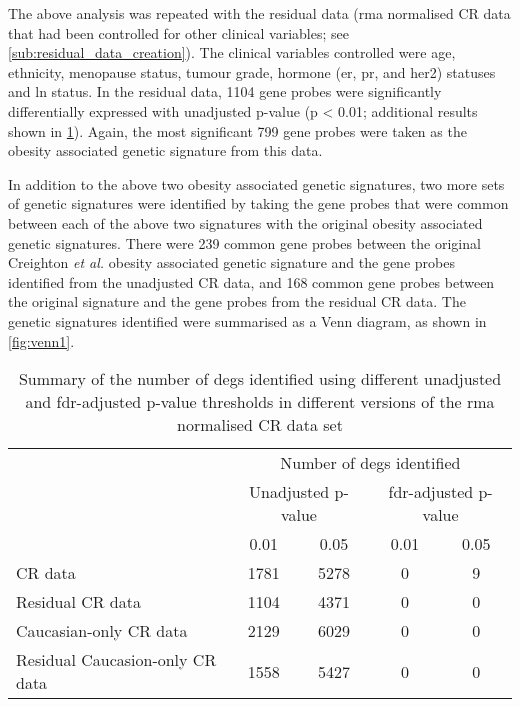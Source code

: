 The above analysis was repeated with the residual data (\gls{rma} normalised CR data that had been controlled for other clinical variables; see \cref{sub:residual_data_creation}).
The clinical variables controlled were age, ethnicity, menopause status, tumour grade, hormone (\gls{er}, \gls{pr}, and \gls{her2}) statuses  and \gls{ln} status.
In the residual data, 1104 gene probes were significantly differentially expressed with unadjusted p-value (p \textless{} 0.01; additional results shown in \cref{tab:ob_deg_summary}).
Again, the most significant 799 gene  probes were taken as the obesity associated genetic signature from this data.

In addition to the above two obesity associated genetic signatures, two more sets of genetic signatures were identified by taking the gene probes that were common between each of the above two signatures with the original obesity associated genetic signatures.
There were 239 common gene probes between the original Creighton \textit{et al.} obesity associated  genetic signature and the gene probes identified from the unadjusted CR data, and 168 common gene probes between the original signature and the gene probes from the residual CR data.
The genetic signatures identified were summarised as a Venn diagram, as shown in \cref{fig:venn1}.
\\

\begin{table}[htpb]
	\centering
	\caption[Summary of the number of \acrshort{deg}s identified using different unadjusted and \acrshort{fdr}-adjusted p-value threshold in different versions of the \gls{rma} normalised CR data set]{Summary of the number of \glspl{deg} identified using different unadjusted and \gls{fdr}-adjusted p-value thresholds in different versions of the \gls{rma} normalised CR data set}
	\label{tab:ob_deg_summary}
	\begin{tabular}{lcccc}
		& \multicolumn{4}{c}{Number of \glspl{deg} identified}\\
		\cmidrule(r){2-5}
		& \multicolumn{2}{c}{Unadjusted p-value} & \multicolumn{2}{c}{\gls{fdr}-adjusted p-value}\\
		\cmidrule(r){2-3} \cmidrule(r){4-5}
		& 0.01 & 0.05 & 0.01 & 0.05\\
		\hline
		\hline
		\rule{0pt}{2.25ex}CR data       & 1781 & 5278 & 0 & 9 \\
		Residual CR data                & 1104 & 4371 & 0 & 0 \\
		Caucasian-only CR data          & 2129 & 6029 & 0 & 0 \\
		Residual Caucasion-only CR data & 1558 & 5427 & 0 & 0 \\
		\hline
		\hline
	\end{tabular}
\end{table}

